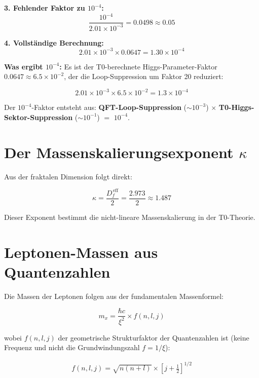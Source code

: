 \textbf{3. Fehlender Faktor zu $10^{-4}$:}
\begin{equation}
	\frac{10^{-4}}{2.01 \times 10^{-3}} = 0.0498 \approx 0.05
\end{equation}

\textbf{4. Vollständige Berechnung:}
\begin{equation}
	2.01 \times 10^{-3} \times 0.0647 = 1.30 \times 10^{-4}
\end{equation}

\textbf{Was ergibt $10^{-4}$:}
Es ist der T0-berechnete Higgs-Parameter-Faktor $0.0647 \approx 6.5 \times 10^{-2}$, der die Loop-Suppression um Faktor 20 reduziert:

\begin{equation}
	2.01 \times 10^{-3} \times 6.5 \times 10^{-2} = 1.3 \times 10^{-4}
\end{equation}

Der $10^{-4}$-Faktor entsteht aus: \textbf{QFT-Loop-Suppression} ($\sim 10^{-3}$) $\times$ \textbf{T0-Higgs-Sektor-Suppression} ($\sim 10^{-1}$) $=$ $10^{-4}$.
	\section{Der Massenskalierungsexponent $\kappa$}
	
	Aus der fraktalen Dimension folgt direkt:
	
	\begin{equation}
		\kappa = \frac{D_f^{\,\text{eff}}}{2} = \frac{2.973}{2} \approx 1.487
	\end{equation}
	
	Dieser Exponent bestimmt die nicht-lineare Massenskalierung in der T0-Theorie.
	
	\section{Leptonen-Massen aus Quantenzahlen}
	
	Die Massen der Leptonen folgen aus der fundamentalen Massenformel:
	
	\begin{equation}
		m_x = \frac{\hbar c}{\xi^2} \times f(n, l, j)
	\end{equation}

	wobei $f(n, l, j)$ der geometrische Strukturfaktor der Quantenzahlen ist (keine Frequenz und nicht die Grundwindungszahl $f = 1/\xi$):
	
	\begin{align}
		f(n, l, j) = \sqrt{n(n+l)} \times \left[j + \frac{1}{2}\right]^{1/2}
	\end{align}
	
